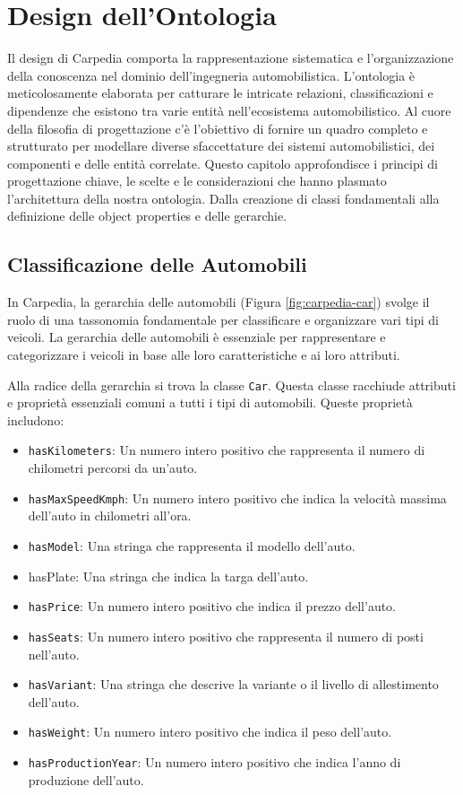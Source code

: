 \chapter{Design dell'Ontologia}

Il design di Carpedia comporta la rappresentazione sistematica e l'organizzazione della conoscenza nel dominio dell'ingegneria automobilistica. L'ontologia è meticolosamente elaborata per catturare le intricate relazioni, classificazioni e dipendenze che esistono tra varie entità nell'ecosistema automobilistico. Al cuore della filosofia di progettazione c'è l'obiettivo di fornire un quadro completo e strutturato per modellare diverse sfaccettature dei sistemi automobilistici, dei componenti e delle entità correlate. Questo capitolo approfondisce i principi di progettazione chiave, le scelte e le considerazioni che hanno plasmato l'architettura della nostra ontologia. Dalla creazione di classi fondamentali alla definizione delle object properties e delle gerarchie.

\section{Classificazione delle Automobili}

In Carpedia, la gerarchia delle automobili (Figura \ref{fig:carpedia-car}) svolge il ruolo di una tassonomia fondamentale per classificare e organizzare vari tipi di veicoli. La gerarchia delle automobili è essenziale per rappresentare e categorizzare i veicoli in base alle loro caratteristiche e ai loro attributi.

Alla radice della gerarchia si trova la classe \texttt{Car}. Questa classe racchiude attributi e proprietà essenziali comuni a tutti i tipi di automobili. Queste proprietà includono:

\begin{itemize}
    \item \texttt{hasKilometers}: Un numero intero positivo che rappresenta il numero di chilometri percorsi da un'auto.
    \item \texttt{hasMaxSpeedKmph}: Un numero intero positivo che indica la velocità massima dell'auto in chilometri all'ora.
    \item \texttt{hasModel}: Una stringa che rappresenta il modello dell'auto.
    \item hasPlate: Una stringa che indica la targa dell'auto.
    \item \texttt{hasPrice}: Un numero intero positivo che indica il prezzo dell'auto.
    \item \texttt{hasSeats}: Un numero intero positivo che rappresenta il numero di posti nell'auto.
    \item \texttt{hasVariant}: Una stringa che descrive la variante o il livello di allestimento dell'auto.
    \item \texttt{hasWeight}: Un numero intero positivo che indica il peso dell'auto.
    \item \texttt{hasProductionYear}: Un numero intero positivo che indica l'anno di produzione dell'auto.
\end{itemize}

